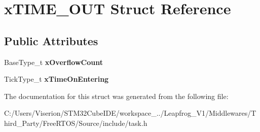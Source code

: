 \hypertarget{structx_t_i_m_e___o_u_t}{}\section{x\+T\+I\+M\+E\+\_\+\+O\+UT Struct Reference}
\label{structx_t_i_m_e___o_u_t}
\subsection*{Public Attributes}
\begin{DoxyCompactItemize}
\item 
\mbox{\label{structx_t_i_m_e___o_u_t_a9289c6f97096a9b3e3fc705d0bc5a160}} 
Base\+Type\+\_\+t {\bfseries x\+Overflow\+Count}
\item 
\mbox{\label{structx_t_i_m_e___o_u_t_a3464939ca050f7bcc6ffe0d8d3766337}} 
Tick\+Type\+\_\+t {\bfseries x\+Time\+On\+Entering}
\end{DoxyCompactItemize}


The documentation for this struct was generated from the following file\+:\begin{DoxyCompactItemize}
\item 
C\+:/\+Users/\+Viserion/\+S\+T\+M32\+Cube\+I\+D\+E/workspace\+\_../\+Leapfrog\+\_\+\+V1/\+Middlewares/\+Third\+\_\+\+Party/\+Free\+R\+T\+O\+S/\+Source/include/task.\+h\end{DoxyCompactItemize}
